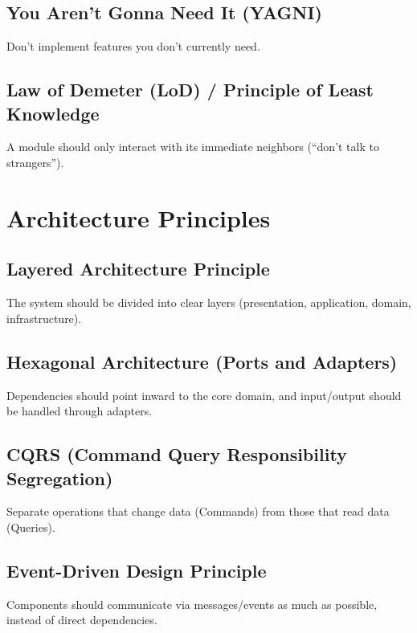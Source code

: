    \subsection{You Aren’t Gonna Need It (YAGNI)}
        Don’t implement features you don’t currently need.
    
    \subsection{Law of Demeter (LoD) / Principle of Least Knowledge}
        A module should only interact with its immediate neighbors (“don’t talk to strangers”).

\section{Architecture Principles}
    
    \subsection{Layered Architecture Principle}
        The system should be divided into clear layers (presentation, application, domain, infrastructure).
    
    \subsection{Hexagonal Architecture (Ports and Adapters)}
        Dependencies should point inward to the core domain, and input/output should be handled through adapters.
    
    \subsection{CQRS (Command Query Responsibility Segregation)}
        Separate operations that change data (Commands) from those that read data (Queries).
    
    \subsection{Event-Driven Design Principle}
        Components should communicate via messages/events as much as possible, instead of direct dependencies.